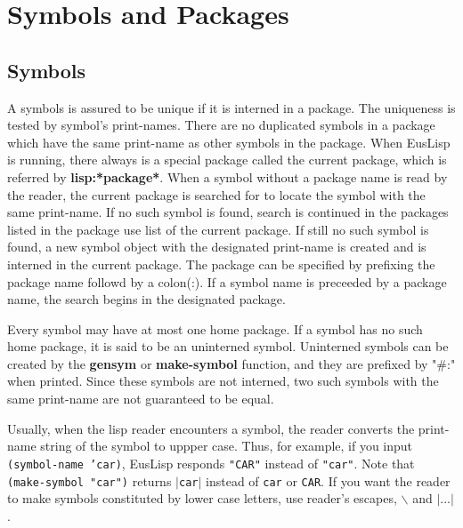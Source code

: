 \section{Symbols and Packages}

\subsection{Symbols}
A symbols is assured to be unique if it is interned in a package.
The uniqueness is tested by symbol's print-names.
There are no duplicated symbols in a package which have the same print-name
as other symbols in the package.
When EusLisp is running, there always is a special package called
the current package, which is referred by {\bf lisp:*package*}.
When a symbol without a package name is read by the reader,
the current package is searched for to locate the symbol with the same
print-name.
If no such symbol is found, search is continued in the packages listed
in the package use list of the current package.
If still no such symbol is found, 
a new symbol object with the designated print-name is created
and is interned in the current package.
The package can be specified by prefixing the package name followd by a colon(:).
If a symbol name is preceeded by a package name, the search begins
in the designated package.

Every symbol may have at most one home package.
If a symbol has no such home package, it is said to be an uninterned symbol.
Uninterned symbols can be created by the {\bf gensym} or {\bf make-symbol}
function, and they are prefixed by "\#:" when printed.
Since these symbols are not interned, two such symbols with the
same print-name are not guaranteed to be equal.

Usually, when the lisp reader encounters a symbol,
the reader converts the print-name string of the symbol to uppper case.
Thus, for example, if you input {\tt (symbol-name 'car)},
EusLisp responds {\tt "CAR"} instead of {\tt "car"}.
Note that {\tt (make-symbol "car")} returns $|${\tt car}$|$ instead of
{\tt car} or {\tt CAR}.
If you want the reader to make symbols constituted by lower case letters,
use reader's escapes, $\backslash$ and $|...|$.


